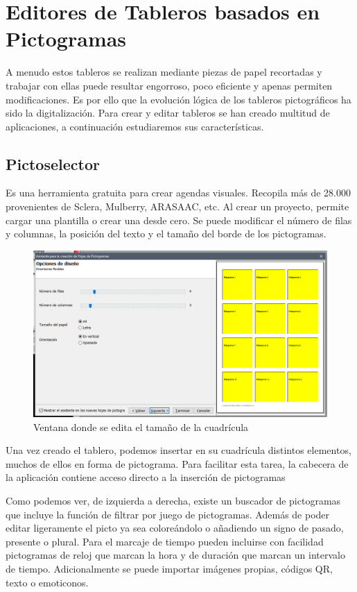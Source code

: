 \section{Editores de Tableros basados en Pictogramas}

A menudo estos tableros se realizan mediante piezas de papel recortadas y trabajar con ellas puede resultar engorroso, poco eficiente y apenas permiten modificaciones. Es por ello que la evolución lógica de los tableros pictográficos ha sido la digitalización. Para crear y editar tableros se han creado multitud de aplicaciones, a continuación estudiaremos sus características.

\subsection{Pictoselector}
Es una herramienta gratuita para crear agendas visuales. Recopila más de 28.000 provenientes de Sclera, Mulberry, ARASAAC, etc. Al crear un proyecto, permite cargar una plantilla o crear una desde cero. Se puede modificar el número de filas y columnas, la posición del texto y el tamaño del borde de los pictogramas.
\begin{figure}[h!]
	\centering
	\includegraphics[width=0.7\linewidth]{Imagenes/Bitmap/Pictoselector Tablero}
	\caption{Ventana donde se edita el tamaño de la cuadrícula}
	\label{fig:pictoselector-tablero}
\end{figure}


Una vez creado el tablero, podemos insertar en su cuadrícula distintos elementos, muchos de ellos en forma de pictograma. Para facilitar esta tarea, la cabecera de la aplicación contiene acceso directo a la inserción de pictogramas



Como podemos ver, de izquierda a derecha, existe un buscador de pictogramas que incluye la función de filtrar por juego de pictogramas. Además de poder editar ligeramente el picto ya sea coloreándolo o añadiendo un signo de pasado, presente o plural. Para el marcaje de tiempo pueden incluirse con facilidad pictogramas de reloj que marcan la hora y de duración que marcan un intervalo de tiempo. Adicionalmente se puede importar imágenes propias, códigos QR, texto o emoticonos.

